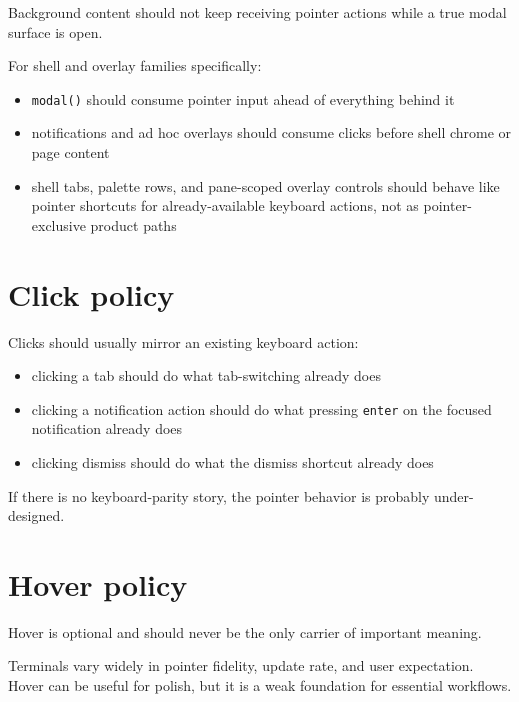 Background content should not keep receiving pointer actions while a true modal surface is open.

For shell and overlay families specifically:

\begin{itemize}
\tightlist
\item
  \texttt{m\allowbreak{}o\allowbreak{}d\allowbreak{}a\allowbreak{}l\allowbreak{}(\allowbreak{})} should consume pointer input ahead of everything behind it
\item
  notifications and ad hoc overlays should consume clicks before shell chrome or page content
\item
  shell tabs, palette rows, and pane-scoped overlay controls should behave like pointer shortcuts for already-available keyboard actions, not as pointer-exclusive product paths
\end{itemize}

\section{Click policy}\label{record-024-click-policy}

Clicks should usually mirror an existing keyboard action:

\begin{itemize}
\tightlist
\item
  clicking a tab should do what tab-switching already does
\item
  clicking a notification action should do what pressing \texttt{e\allowbreak{}n\allowbreak{}t\allowbreak{}e\allowbreak{}r} on the focused notification already does
\item
  clicking dismiss should do what the dismiss shortcut already does
\end{itemize}

If there is no keyboard-parity story, the pointer behavior is probably under-designed.

\section{Hover policy}\label{record-024-hover-policy}

Hover is optional and should never be the only carrier of important meaning.

Terminals vary widely in pointer fidelity, update rate, and user expectation. Hover can be useful for polish, but it is a weak foundation for essential workflows.

